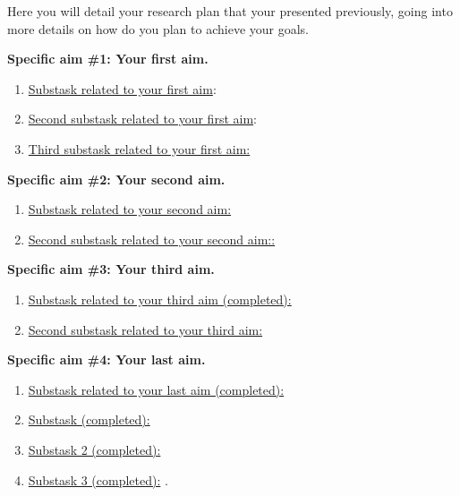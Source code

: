 Here you will detail your research plan that your presented previously, going into more details on how do you plan to achieve your goals.

\vspace{5mm} %

\textbf{Specific aim \#1: Your first aim.} \lipsum[1-3]

\begin{enumerate}
    \item \underline{Substask related to your first aim}: \lipsum[1-3]
    \item \underline{Second substask related to your first aim}: \lipsum[1-3]

    \item \underline{Third substask related to your first aim:} \lipsum[1-3]
\end{enumerate}

\textbf{Specific aim \#2: Your second aim.} \lipsum[1-3]
\begin{enumerate}
    \item \underline{Substask related to your second aim:} \lipsum[1-3]
    \item \underline{Second substask related to your second aim::} \lipsum[1-3]
\end{enumerate}

\textbf{Specific aim \#3: Your third aim.} \lipsum[1-3]

\begin{enumerate}
    \item \underline{Substask related to your third aim (completed):} \lipsum[1-3]
    \item \underline{Second substask related to your third aim:} \lipsum[1-3]
\end{enumerate}


\textbf{Specific aim \#4: Your last aim.} \lipsum[1-3]

\begin{enumerate}
    \item \underline{Substask related to your last aim (completed):} \lipsum[1-3]
    \item \underline{Substask (completed):} \lipsum[1-3]
    \item \underline{Substask 2 (completed):} \lipsum[1-3]
    \item \underline{Substask 3 (completed):} \lipsum[1-3].
   
\end{enumerate}
